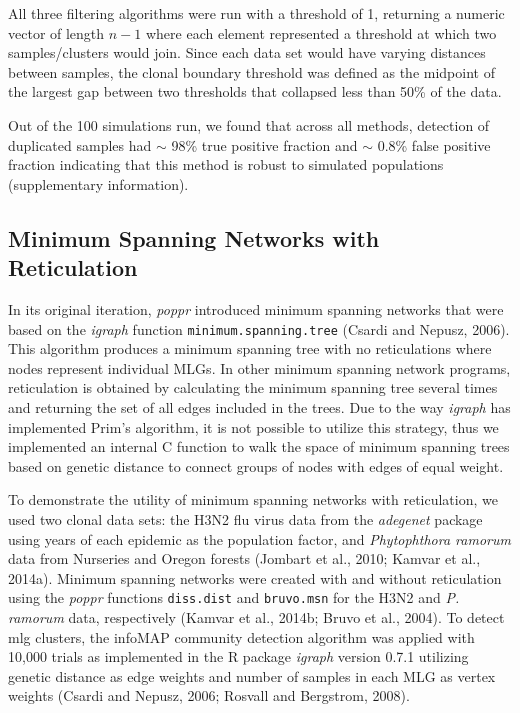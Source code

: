 \documentclass{frontiersSCNS} %
\begin{document}
All three filtering algorithms were run with a threshold of 1, returning
a numeric vector of length \(n - 1\) where each element represented a
threshold at which two samples/clusters would join. Since each data set
would have varying distances between samples, the clonal boundary
threshold was defined as the midpoint of the largest gap between two
thresholds that collapsed less than 50\% of the data.

Out of the 100 simulations run, we found that across all methods,
detection of duplicated samples had \(\sim\) 98\% true positive fraction
and \(\sim\) 0.8\% false positive fraction indicating that this method
is robust to simulated populations (supplementary information).

\subsection*{Minimum Spanning Networks with
Reticulation}\label{minimum-spanning-networks-with-reticulation}

In its original iteration, \emph{poppr} introduced minimum spanning
networks that were based on the \emph{igraph} function
\texttt{minimum.spanning.tree} (Csardi and Nepusz, 2006). This algorithm
produces a minimum spanning tree with no reticulations where nodes
represent individual MLGs. In other minimum spanning network programs,
reticulation is obtained by calculating the minimum spanning tree
several times and returning the set of all edges included in the trees.
Due to the way \emph{igraph} has implemented Prim's algorithm, it is not
possible to utilize this strategy, thus we implemented an internal C
function to walk the space of minimum spanning trees based on genetic
distance to connect groups of nodes with edges of equal weight.

To demonstrate the utility of minimum spanning networks with
reticulation, we used two clonal data sets: the H3N2 flu virus data from
the \emph{adegenet} package using years of each epidemic as the
population factor, and \emph{Phytophthora ramorum} data from Nurseries
and Oregon forests (Jombart et al., 2010; Kamvar et al., 2014a). Minimum
spanning networks were created with and without reticulation using the
\emph{poppr} functions \texttt{diss.dist} and \texttt{bruvo.msn} for the
H3N2 and \emph{P. ramorum} data, respectively (Kamvar et al., 2014b;
Bruvo et al., 2004). To detect mlg clusters, the infoMAP community
detection algorithm was applied with 10,000 trials as implemented in the
R package \emph{igraph} version 0.7.1 utilizing genetic distance as edge
weights and number of samples in each MLG as vertex weights (Csardi and
Nepusz, 2006; Rosvall and Bergstrom, 2008).
\end{document}
